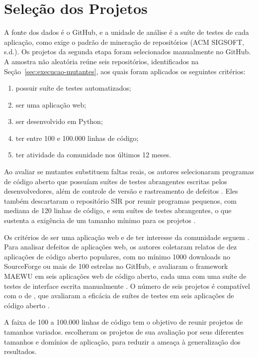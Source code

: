 \section{Seleção dos Projetos}
\label{sec:selecao-preparacao}

A fonte dos dados é o GitHub, e a unidade de análise é a suíte de testes de cada aplicação, como exige o padrão de mineração de repositórios (ACM SIGSOFT, s.d.). Os projetos da segunda etapa foram selecionados manualmente no GitHub. A amostra não aleatória reúne seis repositórios, identificados na Seção~\ref{sec:execucao-mutantes}, aos quais foram aplicados os seguintes critérios:

\begin{enumerate}
    \item possuir suíte de testes automatizados;
    \item ser uma aplicação web;
    \item ser desenvolvido em Python;
    \item ter entre 100 e 100.000 linhas de código;
    \item ter atividade da comunidade nos últimos 12 meses.
\end{enumerate}

Ao avaliar se mutantes substituem faltas reais, os autores selecionaram programas de código aberto que possuíam suítes de testes abrangentes escritas pelos desenvolvedores, além de controle de versão e rastreamento de defeitos \cite{just2014}. Eles também descartaram o repositório SIR por reunir programas pequenos, com mediana de 120 linhas de código, e sem suítes de testes abrangentes, o que sustenta a exigência de um tamanho mínimo para os projetos \cite{just2014}.

Os critérios de ser uma aplicação web e de ter interesse da comunidade seguem . Para analisar defeitos de aplicações web, os autores coletaram relatos de dez aplicações de código aberto populares, com no mínimo 1000 downloads no SourceForge ou mais de 100 estrelas no GitHub, e avaliaram o framework MAEWU em seis aplicações web de código aberto, cada uma com uma suíte de testes de interface escrita manualmente \cite{yandrapally2021}. O número de seis projetos é compatível com o de , que avaliaram a eficácia de suítes de testes em seis aplicações de código aberto \cite{alenezi2016}.

A faixa de 100 a 100.000 linhas de código tem o objetivo de reunir projetos de tamanhos variados.  escolheram os projetos de sua avaliação por seus diferentes tamanhos e domínios de aplicação, para reduzir a ameaça à generalização dos resultados.


